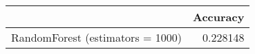 \begin{tabular}{lr}
\toprule
{} &  Accuracy \\
\midrule
RandomForest (estimators = 1000) &  0.228148 \\
\bottomrule
\end{tabular}

